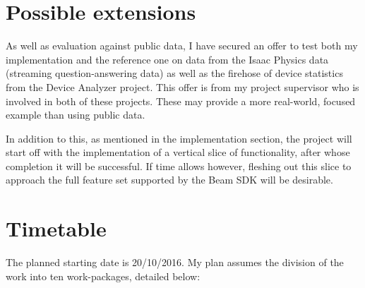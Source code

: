 \documentclass[11pt]{scrartcl}
\begin{document}
\section*{Possible extensions}

As well as evaluation against public data, I have secured an offer to test both my implementation and the reference one on data from the Isaac Physics \cite{Isaac} data (streaming question-answering data) as well as the firehose of device statistics from the Device Analyzer \cite{Device} project. This offer is from my project supervisor who is involved in both of these projects. These may provide a more real-world, focused example than using public data.

In addition to this, as mentioned in the implementation section, the project will start off with the implementation of a vertical slice of functionality, after whose completion it will be successful. If time allows however, fleshing out this slice to approach the full feature set supported by the Beam SDK will be desirable.


\section*{Timetable}

The planned starting date is 20/10/2016. My plan assumes the division of the work into ten work-packages, detailed below:
\end{document}
